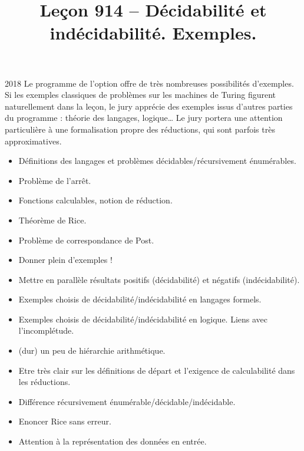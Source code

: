 \documentclass{agregfiche}
\title{Leçon 914 -- Décidabilité et indécidabilité. Exemples.}
\begin{document}
\maketitle

\secrapports

\begin{rapport}{2018}
Le programme de l'option offre de très nombreuses possibilités d'exemples. Si les exemples classiques de problèmes sur les machines de Turing figurent naturellement dans la leçon, le jury apprécie des exemples issus d'autres parties du programme : théorie des langages, logique\dots
Le jury portera une attention particulière à une formalisation propre des réductions, qui sont parfois très approximatives.
\end{rapport}

\secindispensables

\begin{itemize}
\item Définitions des langages et problèmes décidables/récursivement énumérables.
\item Problème de l'arrêt.
\item Fonctions calculables, notion de réduction.
\end{itemize}

\secasavoir

\begin{itemize}
	\item Théorème de Rice.
	\item Problème de correspondance de Post.
	\item Donner plein d'exemples !
\end{itemize}


\secidees
\begin{itemize}
\item Mettre en parallèle résultats positifs (décidabilité) et négatifs (indécidabilité).
\item Exemples choisis de décidabilité/indécidabilité en langages formels.
\item Exemples choisis de décidabilité/indécidabilité en logique. Liens avec l'incomplétude.
\item (dur) un peu de hiérarchie arithmétique.
\end{itemize}

\secpieges

\begin{itemize}
\item Etre très clair sur les définitions de départ et l'exigence de calculabilité dans les réductions.
\item Différence récursivement énumérable/décidable/indécidable.
\item Enoncer Rice sans erreur.
\item Attention à la représentation des données en entrée.
\end{itemize}
\end{document}
